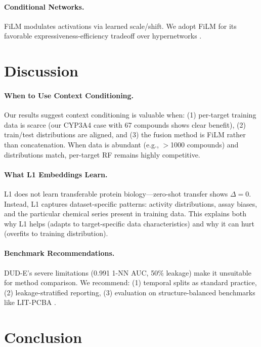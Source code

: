 \documentclass{article}
\begin{document}
\paragraph{Conditional Networks.}
FiLM \citep{perez_2018_film} modulates activations via learned scale/shift. We adopt FiLM for its favorable expressiveness-efficiency tradeoff over hypernetworks \citep{ha_2017_hypernetworks}.

\section{Discussion}
\label{sec:discussion}

\paragraph{When to Use Context Conditioning.}
Our results suggest context conditioning is valuable when: (1) per-target training data is scarce (our CYP3A4 case with 67 compounds shows clear benefit), (2) train/test distributions are aligned, and (3) the fusion method is FiLM rather than concatenation. When data is abundant (e.g., $>$1000 compounds) and distributions match, per-target RF remains highly competitive.

\paragraph{What L1 Embeddings Learn.}
L1 does not learn transferable protein biology---zero-shot transfer shows $\Delta = 0$. Instead, L1 captures dataset-specific patterns: activity distributions, assay biases, and the particular chemical series present in training data. This explains both why L1 helps (adapts to target-specific data characteristics) and why it can hurt (overfits to training distribution).

\paragraph{Benchmark Recommendations.}
DUD-E's severe limitations (0.991 1-NN AUC, 50\% leakage) make it unsuitable for method comparison. We recommend: (1) temporal splits as standard practice, (2) leakage-stratified reporting, (3) evaluation on structure-balanced benchmarks like LIT-PCBA \citep{tran_2020_litpcba}.

\section{Conclusion}
\label{sec:conclusion}
\end{document}
